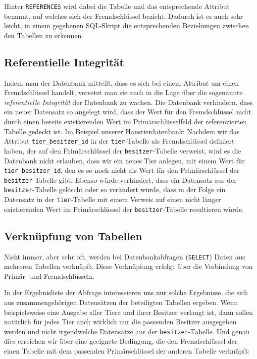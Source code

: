 Hinter \lstinline|REFERENCES| wird dabei die Tabelle und das entsprechende
Attribut benannt, auf welches sich der Fremdschlüssel bezieht. Dadurch ist es
auch sehr leicht, in einem gegebenen SQL-Skript die entsprechenden Beziehungen
zwischen den Tabellen zu erkennen.


\subsection{Referentielle Integrität}

Indem man der Datenbank mitteilt, dass es sich bei einem Attribut um einen
Fremdschlüssel handelt, versetzt man sie auch in die Lage über die sogenannte
\emph{referentielle Integrität} der Datenbank zu wachen. Die Datenbank
verhindern, dass ein neuer Datensatz so angelegt wird, dass der Wert für den
Fremdschlüssel nicht durch einen bereits existierenden Wert im
Primärschlüsselfeld der referenzierten Tabelle gedeckt ist. Im Beispiel unserer
Haustierdatenbank: Nachdem wir das Attribut \lstinline|tier_besitzer_id| in der
\lstinline|tier|-Tabelle als Fremdschlüssel definiert haben, der auf den
Primärschlüssel der \lstinline|besitzer|-Tabelle verweist, wird es die Datenbank
nicht erlauben, dass wir ein neues Tier anlegen, mit einem Wert für
\lstinline|tier_besitzer_id|, den es so noch nicht als Wert für den
Primärschlüssel der \lstinline|besitzer|-Tabelle gibt. Ebenso würde verhindert,
dass ein Datensatz aus der \lstinline|besitzer|-Tabelle gelöscht oder so
verändert würde, dass in der Folge ein Datensatz in der \lstinline|tier|-Tabelle
mit einem Verweis auf einen nicht länger existierenden Wert im Primärschlüssel
der \lstinline|besitzer|-Tabelle resultieren würde.



\subsection{Verknüpfung von Tabellen}

Nicht immer, aber sehr oft, werden bei Datenbankabfragen (\lstinline|SELECT|)
Daten aus mehreren Tabellen verknüpft. Diese Verknüpfung erfolgt über die
Verbindung von Primär- und Fremdschlüsseln.

In der Ergebnisliste der Abfrage interessieren uns nur solche Ergebnisse, die
sich aus zusammengehörigen Datensätzen der beteiligten Tabellen ergeben. Wenn
beispielsweise eine Ausgabe aller Tiere und ihrer Besitzer verlangt ist, dann
sollen natürlich für jedes Tier auch wirklich nur die passenden Besitzer
ausgegeben werden und nicht irgendwelche Datensätze aus der
\lstinline|besitzer|-Tabelle. Und genau dies erreichen wir über eine geeignete
Bedingung, die den Fremdschlüssel der einen Tabelle mit dem passenden
Primärschlüssel der anderen Tabelle verknüpft:

